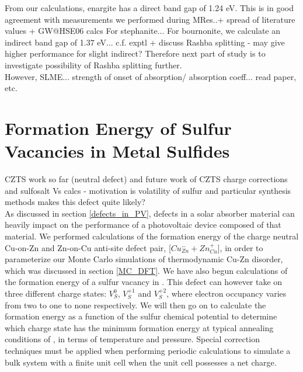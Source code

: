 From our calculations, enargite has a direct band gap of 1.24 eV. This is in good agreement with measurements we performed during MRes..+ spread of literature values + GW@HSE06 calcs
For stephanite...
For bournonite, we calculate an indirect band gap of 1.37 eV... c.f. exptl + discuss Rashba splitting - may give higher performance for slight indirect?
Therefore next part of study is to investigate possibility of Rashba splitting further.\\

However, SLME... strength of onset of absorption/ absorption coeff... read paper, etc.



\section{Formation Energy of Sulfur Vacancies in Metal Sulfides}
CZTS work so far (neutral defect) and future work of CZTS charge corrections and sulfosalt Vs calcs - motivation is volatility of sulfur and particular synthesis methods makes this defect quite likely?\\

As discussed in section \ref{defects_in_PV}, defects in a solar absorber material can heavily impact on the performance of a photovoltaic device composed of that material. We performed calculations of the formation energy of the charge neutral Cu-on-Zn and Zn-on-Cu anti-site defect pair, [$Cu_{Zn}^- + Zn_{Cu}^+$], in order to parameterize our Monte Carlo simulations of thermodynamic Cu-Zn disorder, which was discussed in section \ref{MC_DFT}. We have also begun calculations of the formation energy of a sulfur vacancy in { \CZTS }. This defect can however take on three different charge states: $V_{S}^{0}$, $V_{S}^{+1}$ and $V_{S}^{+2}$, where electron occupancy varies from two to one to none respectively. We will then go on to calculate the formation energy as a function of the sulfur chemical potential to determine which charge state has the minimum formation energy at typical annealing conditions of { \CZTS }, in terms of temperature and pressure. Special correction techniques must be applied when performing periodic calculations to simulate a bulk system with a finite unit cell when the unit cell possesses a net charge. \\

